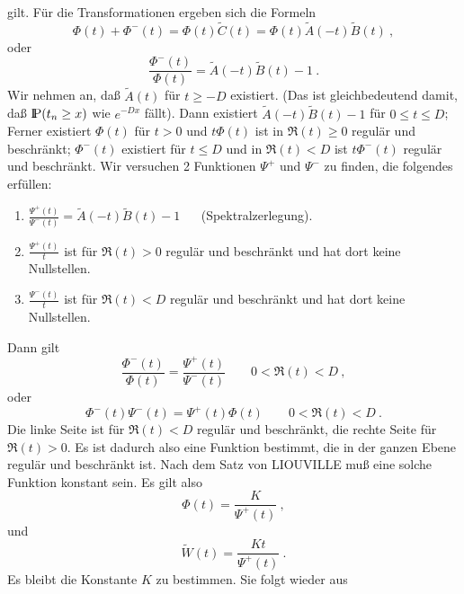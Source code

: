 gilt. Für die Transformationen ergeben sich die Formeln
\begin{displaymath}
\Phi (t) + \Phi^{-}(t) = \Phi (t) \tilde C (t) = \Phi (t) \tilde A (-t)
\tilde B (t) ~,
\end{displaymath}
oder
\begin{displaymath}
\frac{\Phi^{-}(t)}{\Phi (t)} = \tilde A (-t)  \tilde B (t) -1 ~.
\end{displaymath}
Wir nehmen an, daß $\tilde A(t)$ für $t \geq -D$ existiert. (Das ist
gleichbedeutend damit, daß ${\rm I\kern-0.2em P} (t_{n} \geq x)$ wie $e^{-Dx}$ fällt).
Dann existiert $\tilde A (-t) \tilde B (t) - 1$ für $0 \leq t \leq D$;
Ferner existiert $\Phi (t)$ für $t >0$ und $t \Phi (t)$ ist in $\Re (t)
\geq 0$ regulär und beschränkt; $\Phi^{-}(t)$ existiert für $t \leq D$
und in $\Re (t) < D$ ist $t\Phi^{-}(t)$ regulär und beschränkt. Wir
versuchen 2 Funktionen $\Psi^{+}$ und $\Psi^{-}$ zu finden, die folgendes
erfüllen:
\begin{enumerate}
\item $\frac{\Psi^{+}(t)}{\Psi^{-}(t)} = \tilde A(-t) \tilde B(t) -1$ ~ ~(Spektralzerlegung).
\item $\frac{\Psi^{+}(t)}{t}$ ist für $\Re(t)>0$ regulär und beschränkt
und hat dort keine Nullstellen.
\item $\frac{\Psi^{-}(t)}{t}$ ist für $\Re (t) < D$ regulär und
beschränkt und hat dort keine Nullstellen.
\end{enumerate}
Dann gilt
\begin{displaymath}
\frac{\Phi^{-}(t)}{\Phi (t)} = \frac{\Psi^{+}(t)}{\Psi^{-}(t)} \qquad
0< \Re (t) < D ~,
\end{displaymath}
oder
\begin{displaymath}
\Phi^{-}(t) \Psi^{-}(t) = \Psi^{+}(t) \Phi (t) \qquad 0< \Re (t) < D ~.
\end{displaymath}
Die linke Seite ist für $\Re (t) < D$ regulär und beschränkt, die
rechte Seite für $\Re (t) > 0$. Es ist dadurch also eine Funktion
bestimmt, die in der ganzen Ebene regulär und beschränkt ist. Nach dem
Satz von LIOUVILLE muß eine solche Funktion konstant sein. Es gilt also
\begin{displaymath}
\Phi (t) = \frac{K}{\Psi^{+}(t)} ~,
\end{displaymath}
und
\begin{displaymath}
\tilde W (t) =  \frac{Kt}{\Psi^{+}(t)} ~.
\end{displaymath}
Es bleibt die Konstante $K$ zu bestimmen. Sie folgt wieder aus
